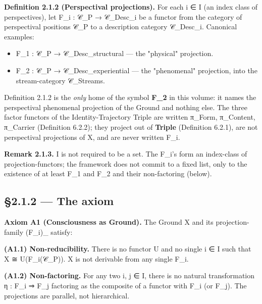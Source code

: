 \documentclass[11pt, openany]{book}
\begin{document}
\textbf{Definition 2.1.2 (Perspectival projections).} For each i ∈ I (an index class of perspectives), let F\_\allowbreak{}i : 𝒞\_\allowbreak{}P → 𝒞\_\allowbreak{}Desc\_\allowbreak{}i be a functor from the category of perspectival positions 𝒞\_\allowbreak{}P to a description category 𝒞\_\allowbreak{}Desc\_\allowbreak{}i. Canonical examples:

\begin{itemize}
\item F\_\allowbreak{}1 : 𝒞\_\allowbreak{}P → 𝒞\_\allowbreak{}Desc\_\allowbreak{}structural --- the "physical" projection.
\item F\_\allowbreak{}2 : 𝒞\_\allowbreak{}P → 𝒞\_\allowbreak{}Desc\_\allowbreak{}experiential --- the "phenomenal" projection, into the stream-category 𝒞\_\allowbreak{}Streams.
\end{itemize}

Definition 2.1.2 is the \textit{only} home of the symbol \textbf{F\_\allowbreak{}2} in this volume: it names the perspectival phenomenal projection of the Ground and nothing else. The three factor functors of the Identity-Trajectory Triple are written π\_\allowbreak{}Form, π\_\allowbreak{}Content, π\_\allowbreak{}Carrier (Definition 6.2.2); they project out of \textbf{Triple} (Definition 6.2.1), are not perspectival projections of X, and are never written F\_\allowbreak{}i.

\textbf{Remark 2.1.3.} I is not required to be a set. The F\_\allowbreak{}i's form an index-class of projection-functors; the framework does not commit to a fixed list, only to the existence of at least F\_\allowbreak{}1 and F\_\allowbreak{}2 and their non-factoring (below).

\subsection{§2.1.2 --- The axiom}

\textbf{Axiom A1 (Consciousness as Ground).} The Ground X and its projection-family (F\_\allowbreak{}i)\_ satisfy:

\textbf{(A1.1) Non-reducibility.} There is no functor U and no single i ∈ I such that X ≅ U(F\_\allowbreak{}i(𝒞\_\allowbreak{}P)). X is not derivable from any single F\_\allowbreak{}i.

\textbf{(A1.2) Non-factoring.} For any two i, j ∈ I, there is no natural transformation η : F\_\allowbreak{}i ⇒ F\_\allowbreak{}j factoring as the composite of a functor with F\_\allowbreak{}i (or F\_\allowbreak{}j). The projections are parallel, not hierarchical.
\end{document}
